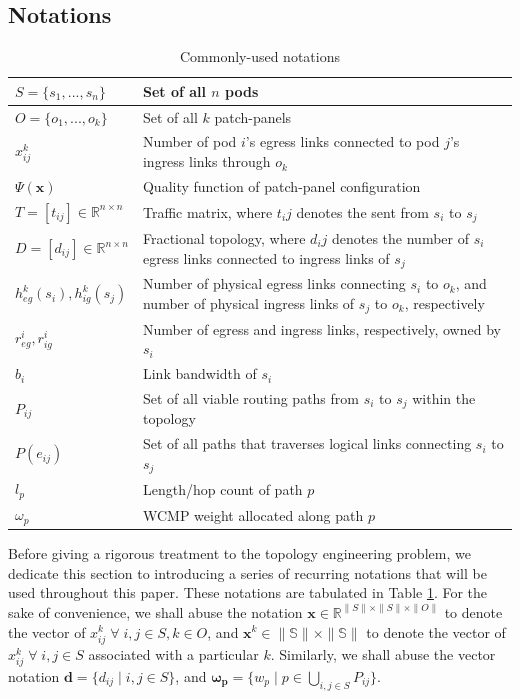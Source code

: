 \documentclass[sigconf]{acmart}
\theoremstyle{definition}
\begin{document}
\subsection{Notations}
\begin{table}
\begin{tabular}{|p{2.2cm}|p{5.8cm}|}
\hline
$S = \{s_1, ..., s_n\}$ & Set of all $n$ pods\\
\hline
$O = \{o_1, ..., o_k\}$ & Set of all $k$ patch-panels\\
\hline
$x_{ij}^k$ & Number of pod $i$'s egress links connected to pod $j$'s ingress links through $o_k$\\ 
\hline
$\Psi(\mathbf{x})$ & Quality function of patch-panel configuration\\
\hline
$T = [t_{ij}] \in \mathbb{R}^{n\times n}$ & Traffic matrix, where $t_ij$ denotes the sent from $s_i$ to $s_j$\\ 
\hline
$D = [d_{ij}] \in \mathbb{R}^{n\times n}$ & Fractional topology, where $d_ij$ denotes the number of $s_i$ egress links connected to ingress links of $s_j$\\ 
\hline
$h_{eg}^k(s_i), h_{ig}^k(s_j)$ & Number of physical egress links connecting $s_i$ to $o_k$, and number of physical ingress links of $s_j$ to $o_k$, respectively\\
\hline
$r_{eg}^i, r_{ig}^i$ & Number of egress and ingress links, respectively, owned by $s_i$\\
\hline
$b_i$ & Link bandwidth of $s_i$\\
\hline
$P_{ij}$ & Set of all viable routing paths from $s_i$ to $s_j$ within the topology\\
\hline
$P(e_{ij})$ & Set of all paths that traverses logical links connecting $s_i$ to $s_j$\\
\hline
$l_p$ & Length/hop count of path $p$ \\
\hline

$\omega_{p}$ & WCMP weight allocated along path $p$ \\
\hline
\end{tabular}
\caption{Commonly-used notations} 
\label{table:notations}
\end{table}
 Before giving a rigorous treatment to the topology engineering problem, we dedicate this section to introducing a series of recurring notations that will be used throughout this paper. These notations are tabulated in Table \ref{table:notations}. For the sake of convenience, we shall abuse the notation $\mathbf{x} \in \mathbb{R}^{\lVert S \lVert \times \lVert S \lVert \times \lVert O \lVert}$ to denote the vector of $x_{ij}^k \; \forall \; i, j \in S, k \in O$, and $\mathbf{x}^k \in \mathbb{\lVert S \lVert \times \lVert S \lVert}$ to denote the vector of $x_{ij}^k \; \forall \; i, j \in S$ associated with a particular $k$. Similarly, we shall abuse the vector notation $\mathbf{d} = \{d_{ij} \; | \; i, j \in S\}$, and $\boldsymbol{\omega_p} = \{w_p \; | \; p \in \bigcup\limits_{i, j \in S}P_{ij}\}$.
\end{document}
